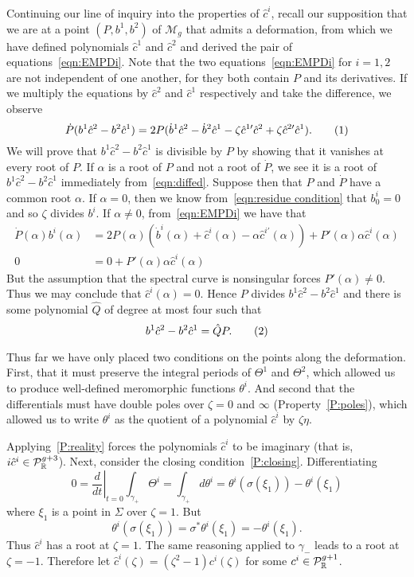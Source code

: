 \documentclass{article}
\begin{document}
Continuing our line of inquiry into the properties of $\hat{c}^i$, recall our supposition that we are at a point $(P,b^1,b^2)$ of $\mathcal{M}_g$ that admits a deformation, from which we have defined polynomials $\hat{c}^1$ and $\hat{c}^2$ and derived the pair of equations~\eqref{eqn:EMPDi}. Note that the two equations~\eqref{eqn:EMPDi} for $i=1,2$ are not independent of one another, for they both contain $P$ and its derivatives. If we multiply the equations by $\hat c^2$ and $\hat c^1$ respectively and take the difference, we observe
\[
\dot P (b^1\hat c^2 - b^2\hat c^1) =  2P(\dot b^1\hat c^2 - \dot b^2\hat c^1 - \zeta\hat{c}^{1\prime}\hat c^2 + \zeta\hat{c}^{2\prime}\hat c^1).\labelthis{eqn:diffed}
\]
We will prove that $b^1\hat c^2 - b^2\hat c^1$ is divisible by $P$ by showing that it vanishes at every root of $P$. If $\alpha$ is a root of $P$ and not a root of $\dot{P}$, we see it is a root of $b^1\hat c^2 - b^2 \hat c^1$ immediately from~\eqref{eqn:diffed}. Suppose then that $P$ and $\dot P$ have a common root $\alpha$. If $\alpha=0$, then we know from~\eqref{eqn:residue condition} that $b^i_0=0$ and so $\zeta$ divides $b^i$. If $\alpha\neq 0$, from~\eqref{eqn:EMPDi} we have that
\begin{align*}
\dot P(\alpha) b^i(\alpha) &= 2P(\alpha)\left( \dot b^i(\alpha) + \hat c^i(\alpha) - \alpha\hat{c}^{i\prime}(\alpha)\right) +P'(\alpha)\alpha\hat c^i(\alpha) \\
0 &= 0 + P'(\alpha)\alpha\hat{c}^i(\alpha)
\end{align*}
But the assumption that the spectral curve is nonsingular forces $P'(\alpha)\neq 0$. Thus we may conclude that $\hat{c}^i(\alpha)=0$. Hence $P$ divides $b^1\hat c^2 - b^2 \hat c^1$ and there is some polynomial $\hat{Q}$ of degree at most four such that
\[
b^1 \hat{c}^2 - b^2 \hat{c}^1 = \hat{Q} P.
\labelthis{eqn:Q hat}
\]

Thus far we have only placed two conditions on the points along the deformation. First, that it must preserve the integral periods of $\Theta^1$ and $\Theta^2$, which allowed us to produce well-defined meromorphic functions $\theta^i$. And second that the differentials must have double poles over $\zeta=0$ and $\infty$ (Property~\ref{P:poles}), which allowed us to write $\theta^i$ as the quotient of a polynomial $\hat{c}^i$ by $\zeta\eta$. 

Applying~\ref{P:reality} forces the polynomials $\hat{c}^i$ to be imaginary (that is, $i\hat{c}^i \in \mathcal{P}^{g+3}_{\mathbb{R}}$). Next, consider the closing condition~\ref{P:closing}. Differentiating
\[
0 
= \left.\frac{d}{dt}\right|_{t=0} \int_{\gamma_+} \Theta^i
= \int_{\gamma_+} d\theta^i
= \theta^i(\sigma(\xi_1)) - \theta^i(\xi_1)
\]
where $\xi_1$ is a point in $\Sigma$ over $\zeta=1$.
But
\[
\theta^i(\sigma(\xi_1)) = \sigma^* \theta^i (\xi_1) = - \theta^i(\xi_1).
\]
Thus $\hat c^i$ has a root at $\zeta=1$. The same reasoning applied to $\gamma_-$ leads to a root at $\zeta=-1$. Therefore let $\hat c^i(\zeta) = (\zeta^2 - 1) c^i(\zeta)$ for some $c^i \in \mathcal{P}^{g+1}_{\mathbb{R}}$. 
\end{document}
